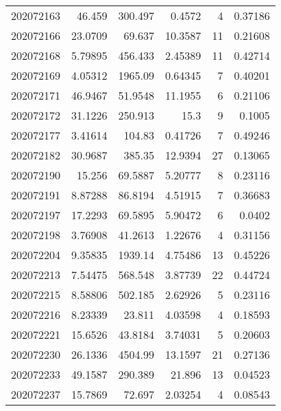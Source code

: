 \begin{tabular}{rrrrrr}
 202072163 &         46.459   &      300.497  &            0.4572  &           4 & 0.37186 \\
 202072166 &         23.0709  &       69.637  &           10.3587  &          11 & 0.21608 \\
 202072168 &          5.79895 &      456.433  &            2.45389 &          11 & 0.42714 \\
 202072169 &          4.05312 &     1965.09   &            0.64345 &           7 & 0.40201 \\
 202072171 &         46.9467  &       51.9548 &           11.1955  &           6 & 0.21106 \\
 202072172 &         31.1226  &      250.913  &           15.3     &           9 & 0.1005  \\
 202072177 &          3.41614 &      104.83   &            0.41726 &           7 & 0.49246 \\
 202072182 &         30.9687  &      385.35   &           12.9394  &          27 & 0.13065 \\
 202072190 &         15.256   &       69.5887 &            5.20777 &           8 & 0.23116 \\
 202072191 &          8.87288 &       86.8194 &            4.51915 &           7 & 0.36683 \\
 202072197 &         17.2293  &       69.5895 &            5.90472 &           6 & 0.0402  \\
 202072198 &          3.76908 &       41.2613 &            1.22676 &           4 & 0.31156 \\
 202072204 &          9.35835 &     1939.14   &            4.75486 &          13 & 0.45226 \\
 202072213 &          7.54475 &      568.548  &            3.87739 &          22 & 0.44724 \\
 202072215 &          8.58806 &      502.185  &            2.62926 &           5 & 0.23116 \\
 202072216 &          8.23339 &       23.811  &            4.03598 &           4 & 0.18593 \\
 202072221 &         15.6526  &       43.8184 &            3.74031 &           5 & 0.20603 \\
 202072230 &         26.1336  &     4504.99   &           13.1597  &          21 & 0.27136 \\
 202072233 &         49.1587  &      290.389  &           21.896   &          13 & 0.04523 \\
 202072237 &         15.7869  &       72.697  &            2.03254 &           4 & 0.08543 \\

\end{tabular}
